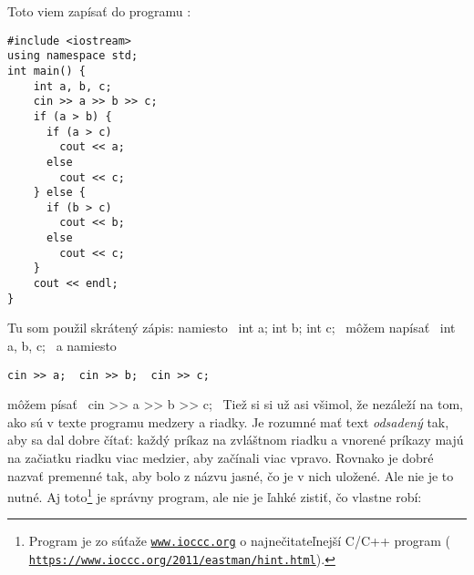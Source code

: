 

Toto viem zapísať do programu :

\begin{lstlisting}
#include <iostream>
using namespace std;
int main() {
    int a, b, c;
    cin >> a >> b >> c;
    if (a > b) {      
      if (a > c)
        cout << a;
      else
        cout << c;
    } else {
      if (b > c)
        cout << b;
      else
        cout << c;
    }
    cout << endl;
}
\end{lstlisting}


Tu som použil skrátený zápis: namiesto \prg~int a; int b; int c;~ môžem napísať
\prg~int a, b, c;~ a namiesto 

\begin{lstlisting}
cin >> a;  cin >> b;  cin >> c;
\end{lstlisting}

môžem písať
\prg~cin >> a >> b >> c;~ Tiež si si už asi všimol, že nezáleží na tom, ako
sú v texte programu medzery a riadky. Je rozumné mať text {\em odsadený} tak,
aby sa dal dobre čítať: každý príkaz na zvláštnom riadku a vnorené príkazy 
majú na začiatku riadku viac medzier, aby začínali viac vpravo. 
Rovnako je dobré nazvať premenné tak,
aby bolo z názvu jasné, čo je v nich uložené. 
Ale nie je to nutné. Aj toto\footnote{
  Program je zo súťaže \href{www.ioccc.org}{\nolinkurl{www.ioccc.org}} o 
  najnečitateľnejší C/C++ 
  program
  (\href{https://www.ioccc.org/2011/eastman/hint.html}{%
\nolinkurl{https://www.ioccc.org/2011/eastman/hint.html}}).}
je správny program, ale nie je ľahké zistiť, 
čo vlastne robí:

